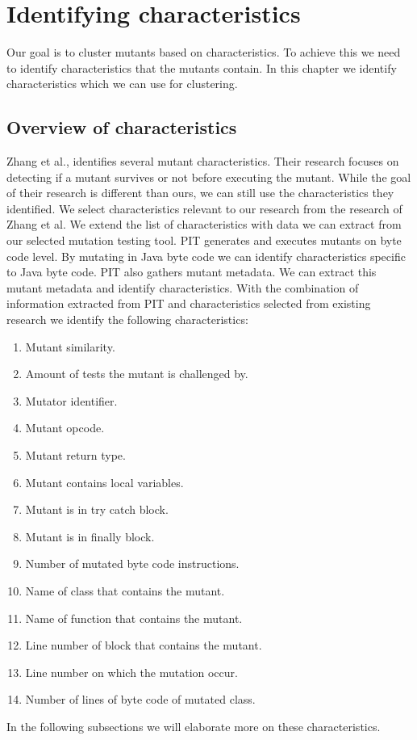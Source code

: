 \documentclass[../main]{subfiles}
\begin{document}
\chapter{Identifying characteristics}
\label{ch:clustering_characteristics}
Our goal is to cluster mutants based on characteristics. 
To achieve this we need to identify characteristics that the mutants contain. 
In this chapter we identify characteristics which we can use for clustering. 

\section{Overview of characteristics}
Zhang et al., identifies several mutant characteristics\cite{Zhang2019PredictiveTesting}. 
Their research focuses on detecting if a mutant survives or not before executing the mutant.
While the goal of their research is different than ours, we can still use the characteristics they identified.
We select characteristics relevant to our research from the research of Zhang et al.
We extend the list of characteristics with data we can extract from our selected mutation testing tool. 
\newline
PIT generates and executes mutants on byte code level\cite{pitestBytecode}.
By mutating in Java byte code we can identify characteristics specific to Java byte code.
PIT also gathers mutant metadata.
We can extract this mutant metadata and identify characteristics. 
With the combination of information extracted from PIT and characteristics selected from existing research we identify the following characteristics:
\begin{enumerate}
    \item Mutant similarity.
    \item Amount of tests the mutant is challenged by.
    \item Mutator identifier.
    \item Mutant opcode.
    \item Mutant return type.
    \item Mutant contains local variables.
    \item Mutant is in try catch block.
    \item Mutant is in finally block.
    \item Number of mutated byte code instructions.
    \item Name of class that contains the mutant.
    \item Name of function that contains the mutant.
    \item Line number of block that contains the mutant.
    \item Line number on which the mutation occur.
    \item Number of lines of byte code of mutated class.
\end{enumerate}
In the following subsections we will elaborate more on these characteristics.
\end{document}
